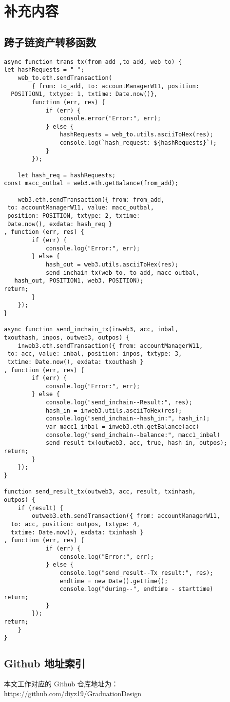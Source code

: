 
\chapter{补充内容}

\section{跨子链资产转移函数}

\begin{verbatim}
async function trans_tx(from_add ,to_add, web_to) {
let hashRequests = " ";
	web_to.eth.sendTransaction(
		{ from: to_add, to: accountManagerW11, position:
  POSITION1, txtype: 1, txtime: Date.now()},
		function (err, res) {
			if (err) {
				console.error("Error:", err);
			} else {
				hashRequests = web_to.utils.asciiToHex(res);
				console.log(`hash_request: ${hashRequests}`);
			}
		});

	let hash_req = hashRequests;
const macc_outbal = web3.eth.getBalance(from_add);
        
	web3.eth.sendTransaction({ from: from_add, 
 to: accountManagerW11, value: macc_outbal, 
 position: POSITION, txtype: 2, txtime:
 Date.now(), exdata: hash_req }
, function (err, res) {
		if (err) {
			console.log("Error:", err);
		} else {
			hash_out = web3.utils.asciiToHex(res);
			send_inchain_tx(web_to, to_add, macc_outbal,
   hash_out, POSITION1, web3, POSITION);
return;
		}
	});
}

async function send_inchain_tx(inweb3, acc, inbal, 
txouthash, inpos, outweb3, outpos) {
	inweb3.eth.sendTransaction({ from: accountManagerW11,
 to: acc, value: inbal, position: inpos, txtype: 3,
 txtime: Date.now(), exdata: txouthash }
, function (err, res) {
		if (err) {
			console.log("Error:", err);
		} else {
			console.log("send_inchain--Result:", res);
			hash_in = inweb3.utils.asciiToHex(res);
			console.log("send_inchain--hash_in:", hash_in);
			var macc1_inbal = inweb3.eth.getBalance(acc)
			console.log("send_inchain--balance:", macc1_inbal)
			send_result_tx(outweb3, acc, true, hash_in, outpos);
return;
		}
	});
}

function send_result_tx(outweb3, acc, result, txinhash,
outpos) {
	if (result) {
		outweb3.eth.sendTransaction({ from: accountManagerW11, 
  to: acc, position: outpos, txtype: 4,
  txtime: Date.now(), exdata: txinhash }
, function (err, res) {
			if (err) {
				console.log("Error:", err);
			} else {
				console.log("send_result--Tx_result:", res);
				endtime = new Date().getTime();
				console.log("during--", endtime - starttime)
return;
			}
		});
return;
	}
}
\end{verbatim}

\section{Github 地址索引}

本文工作对应的 Github 仓库地址为：
https://github.com/diyz19/GraduationDesign

